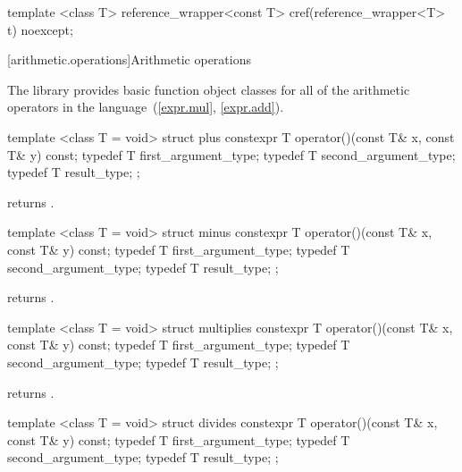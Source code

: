 %
%
\begin{itemdecl}
template <class T> reference_wrapper<const T> cref(reference_wrapper<T> t) noexcept;
\end{itemdecl}

\begin{itemdescr}
\pnum\returns {}
\end{itemdescr}

[arithmetic.operations]{Arithmetic operations}

\pnum
The library provides basic function object classes for all of the arithmetic
operators in the language~(\ref{expr.mul}, \ref{expr.add}).

%
\begin{itemdecl}
template <class T = void> struct plus {
  constexpr T operator()(const T& x, const T& y) const;
  typedef T first_argument_type;
  typedef T second_argument_type;
  typedef T result_type;
};
\end{itemdecl}

\begin{itemdescr}
\pnum
{}
returns
.
\end{itemdescr}

%
\begin{itemdecl}
template <class T = void> struct minus {
  constexpr T operator()(const T& x, const T& y) const;
  typedef T first_argument_type;
  typedef T second_argument_type;
  typedef T result_type;
};
\end{itemdecl}

\begin{itemdescr}
\pnum
{}
returns
.
\end{itemdescr}

%
\begin{itemdecl}
template <class T = void> struct multiplies {
  constexpr T operator()(const T& x, const T& y) const;
  typedef T first_argument_type;
  typedef T second_argument_type;
  typedef T result_type;
};
\end{itemdecl}

\begin{itemdescr}
\pnum
{}
returns
.
\end{itemdescr}

%
\begin{itemdecl}
template <class T = void> struct divides {
  constexpr T operator()(const T& x, const T& y) const;
  typedef T first_argument_type;
  typedef T second_argument_type;
  typedef T result_type;
};
\end{itemdecl}

